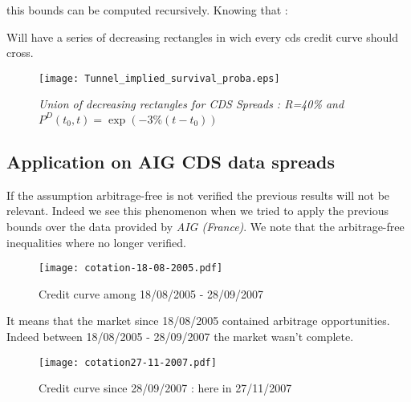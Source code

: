 this bounds can be computed recursively. Knowing that :



Will have a series of decreasing
rectangles in wich every cds credit curve should cross.
\begin{figure}[H]
  \centering
  \texttt{[image: Tunnel\_implied\_survival\_proba.eps]}
  \caption{\it Union of decreasing rectangles for CDS Spreads : R=40\% and $P^D(t_0,t) = \exp(-3\%(t-t_0))$}
\end{figure}

\subsection{Application on AIG CDS data spreads}
\label{sec:application-aig-cds}

\quad If the assumption arbitrage-free is not verified the previous results will not
be relevant. Indeed we  see this phenomenon when we tried  to apply the previous
bounds  over  the  data  provided  by  {\it AIG  (France)}.  We  note  that  the
arbitrage-free inequalities where no longer verified. \\

\begin{figure}[H]
  \label{fig:5}
  \centering
  \texttt{[image: cotation-18-08-2005.pdf]}
  \caption{Credit curve among 18/08/2005 -  28/09/2007}
\end{figure}

It   means    that   the    market   since   18/08/2005    contained   arbitrage
opportunities.  Indeed  between  18/08/2005   -  28/09/2007  the  market  wasn't
complete.
 
\begin{figure}[H]
  \centering
  \texttt{[image: cotation27-11-2007.pdf]}
  \caption{Credit curve since 28/09/2007 : here in 27/11/2007}
\end{figure}


